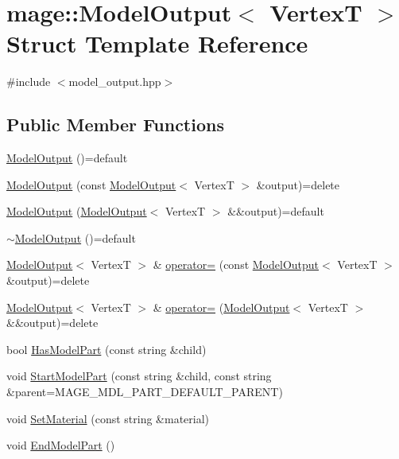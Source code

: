 \hypertarget{structmage_1_1_model_output}{}\section{mage\+:\+:Model\+Output$<$ VertexT $>$ Struct Template Reference}
\label{structmage_1_1_model_output}


{\ttfamily \#include $<$model\+\_\+output.\+hpp$>$}

\subsection*{Public Member Functions}
\begin{DoxyCompactItemize}
\item 
\hyperlink{structmage_1_1_model_output_a7d64b57d8207968541eb9c6da6ef0163}{Model\+Output} ()=default
\item 
\hyperlink{structmage_1_1_model_output_aac808e40a66f33da4ea28ebb7443623d}{Model\+Output} (const \hyperlink{structmage_1_1_model_output}{Model\+Output}$<$ VertexT $>$ \&output)=delete
\item 
\hyperlink{structmage_1_1_model_output_a20faa6e5b76ec7903a09e222e61e5353}{Model\+Output} (\hyperlink{structmage_1_1_model_output}{Model\+Output}$<$ VertexT $>$ \&\&output)=default
\item 
\hyperlink{structmage_1_1_model_output_a69a7f27486ad287943cbf973107ad8e1}{$\sim$\+Model\+Output} ()=default
\item 
\hyperlink{structmage_1_1_model_output}{Model\+Output}$<$ VertexT $>$ \& \hyperlink{structmage_1_1_model_output_ada52bf380c0259a0d7ef855457e5a9da}{operator=} (const \hyperlink{structmage_1_1_model_output}{Model\+Output}$<$ VertexT $>$ \&output)=delete
\item 
\hyperlink{structmage_1_1_model_output}{Model\+Output}$<$ VertexT $>$ \& \hyperlink{structmage_1_1_model_output_a5e368e3ae8a52d329f8d9b5f1c4b9d03}{operator=} (\hyperlink{structmage_1_1_model_output}{Model\+Output}$<$ VertexT $>$ \&\&output)=delete
\item 
bool \hyperlink{structmage_1_1_model_output_a23ce6e3b252227781c173149b76e73ee}{Has\+Model\+Part} (const string \&child)
\item 
void \hyperlink{structmage_1_1_model_output_a9e4d94547fbc318961d8c695149cdf14}{Start\+Model\+Part} (const string \&child, const string \&parent=M\+A\+G\+E\+\_\+\+M\+D\+L\+\_\+\+P\+A\+R\+T\+\_\+\+D\+E\+F\+A\+U\+L\+T\+\_\+\+P\+A\+R\+E\+NT)
\item 
void \hyperlink{structmage_1_1_model_output_abd614f9f2e9f9dbc0b2c354ee37f2998}{Set\+Material} (const string \&material)
\item 
void \hyperlink{structmage_1_1_model_output_a5df0c4240b1fac61ac0cdbf9766bb98d}{End\+Model\+Part} ()
\end{DoxyCompactItemize}
